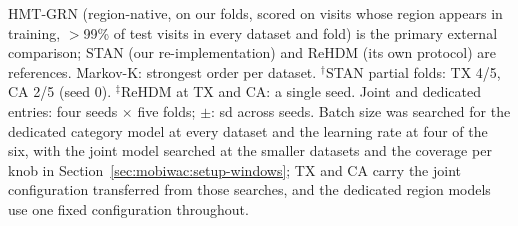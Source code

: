 \begin{table}[htbp]
\vspace{2pt}
{\footnotesize HMT-GRN (region-native, on
our folds, scored on visits whose region appears in training, $>$99\% of test visits in every dataset
and fold) is the primary external comparison; STAN (our re-implementation) and ReHDM (its own protocol)
are references. Markov-K: strongest order per dataset. $^{\dagger}$STAN partial folds: TX 4/5, CA 2/5
(seed 0). $^{\ddagger}$ReHDM at TX and CA: a single seed. Joint and dedicated entries: four seeds
$\times$ five folds; $\pm$: sd across seeds. Batch size was searched for the dedicated
category model at every dataset and the learning rate at four of the six, with the joint model
searched at the smaller datasets and the coverage per knob in
Section~\ref{sec:mobiwac:setup-windows}; TX and CA
carry the joint configuration transferred from those searches, and the dedicated region models use one
fixed configuration throughout.}
\end{table}
